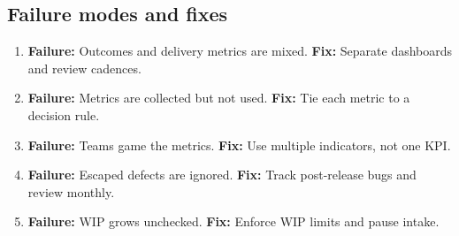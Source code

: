 \subsection{Failure modes and fixes}
\begin{enumerate}
  \item \textbf{Failure:} Outcomes and delivery metrics are mixed. \textbf{Fix:} Separate dashboards and review cadences.
  \item \textbf{Failure:} Metrics are collected but not used. \textbf{Fix:} Tie each metric to a decision rule.
  \item \textbf{Failure:} Teams game the metrics. \textbf{Fix:} Use multiple indicators, not one KPI.
  \item \textbf{Failure:} Escaped defects are ignored. \textbf{Fix:} Track post-release bugs and review monthly.
  \item \textbf{Failure:} WIP grows unchecked. \textbf{Fix:} Enforce WIP limits and pause intake.
\end{enumerate}










